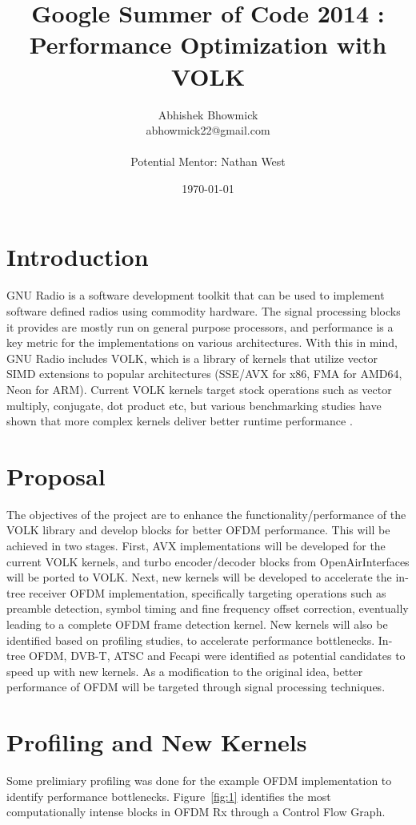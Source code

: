 \documentclass[a4paper,12pt,oneside]{article}
\title{Google Summer of Code 2014 : Performance Optimization with VOLK}
\date{\today}
\author{Abhishek Bhowmick\\ abhowmick22@gmail.com\\ \\Potential Mentor: Nathan West}
\begin{document}
\maketitle
\tableofcontents
\newpage
\section{Introduction}
GNU Radio \cite{gnuradio} is a software development toolkit that can be used to implement software defined radios using commodity hardware. The signal processing blocks it provides are mostly run on general purpose processors, and performance is a key metric for the implementations on various architectures. With this in mind, GNU Radio includes VOLK, which is a library of kernels that utilize vector SIMD extensions to popular architectures (SSE/AVX for x86, FMA for AMD64, Neon for ARM). Current VOLK kernels target stock operations such as vector multiply, conjugate, dot product etc, but various benchmarking studies have shown that more complex kernels deliver better runtime performance \cite{volk-benchmark}.   

\section{Proposal}

The objectives of the project are to enhance the functionality/performance of the VOLK library and develop blocks for better OFDM performance. This will be achieved in two stages. First, AVX implementations will be developed for the current VOLK kernels, and turbo encoder/decoder blocks from OpenAirInterfaces \cite{openair} will be ported to VOLK. Next, new kernels will be developed to accelerate the in-tree receiver OFDM implementation, specifically targeting operations such as preamble detection, symbol timing and fine frequency offset correction, eventually leading to a complete OFDM frame detection kernel. New kernels will also be identified based on profiling studies, to accelerate performance bottlenecks. In-tree OFDM, DVB-T, ATSC and Fecapi were identified as potential candidates to speed up with new kernels. As a modification to the original idea, better performance of OFDM will be targeted through signal processing techniques.

\section{Profiling and New Kernels}
\label{sec:profiling}
Some prelimiary profiling was done for the example OFDM implementation to identify performance bottlenecks. Figure~\ref{fig:1} identifies the most computationally intense blocks in OFDM Rx through a Control Flow Graph. 
\end{document}
